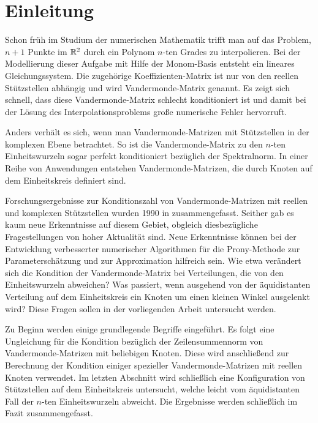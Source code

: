 \chapter{Einleitung}


Schon früh im Studium der numerischen Mathematik trifft man auf das Problem,
$n+1$ Punkte im $\mathbb{R}^2$ durch ein Polynom $n$-ten Grades zu interpolieren.  Bei
der Modellierung dieser Aufgabe mit Hilfe der Monom-Basis entsteht ein lineares
Gleichungssystem.  Die zugehörige Koeffizienten-Matrix ist nur von den reellen
Stützstellen abhängig und wird Vandermonde-Matrix genannt.  Es zeigt sich
schnell, dass diese Vandermonde-Matrix schlecht konditioniert ist und damit bei
der Lösung des Interpolationsproblems große numerische Fehler hervorruft.

Anders verhält es sich, wenn man Vandermonde-Matrizen mit Stützstellen in der
komplexen Ebene betrachtet.  So ist die Vandermonde-Matrix zu den $n$-ten
Einheitswurzeln sogar perfekt konditioniert bezüglich der Spektralnorm.  In
einer Reihe von Anwendungen entstehen Vandermonde-Matrizen, die durch Knoten
auf dem Einheitskreis definiert sind.

Forschungsergebnisse zur Konditionszahl von Vandermonde-Matrizen mit reellen
und komplexen Stützstellen wurden 1990 in \cite{gautschi1} zusammengefasst.
Seither gab es kaum neue Erkenntnisse auf diesem Gebiet, obgleich
diesbezügliche Fragestellungen von hoher Aktualität sind.
Neue Erkenntnisse können bei der Entwicklung verbesserter numerischer
Algorithmen für die Prony-Methode zur Parameterschätzung und zur Approximation
hilfreich sein.
Wie etwa verändert sich die Kondition der Vandermonde-Matrix bei Verteilungen,
die von den Einheitswurzeln abweichen?  Was passiert, wenn ausgehend von der
äquidistanten Verteilung auf dem Einheitskreis ein Knoten um einen kleinen
Winkel ausgelenkt wird?
Diese Fragen sollen in der vorliegenden Arbeit untersucht werden.

Zu Beginn werden einige grundlegende Begriffe eingeführt. Es folgt eine
Ungleichung für die Kondition bezüglich der Zeilensummennorm von
Vandermonde-Matrizen mit beliebigen Knoten.  Diese wird anschließend zur
Berechnung der Kondition einiger spezieller Vandermonde-Matrizen mit reellen
Knoten verwendet.  Im letzten Abschnitt wird schließlich eine Konfiguration von
Stützstellen auf dem Einheitskreis untersucht, welche leicht vom äquidistanten
Fall der $n$-ten Einheitswurzeln abweicht. Die Ergebnisse werden schließlich im
Fazit zusammengefasst.
